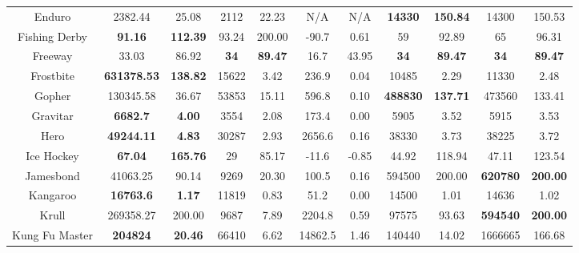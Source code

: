 \documentclass[nohyperref]{article}
\newcommand{\best}[1]{\textbf{#1}}
\theoremstyle{plain}
\begin{document}
\begin{table}[!hb]
\begin{center}
\begin{tabular}{|c |c c| c c| c c| c c| c c| }
 Enduro             & 2382.44                 & 25.08       & 2112              &22.23         & N/A               & N/A     & \best{14330}    & \best{150.84}  &14300     &150.53\\
 Fishing Derby      & \textbf{91.16}          & \textbf{112.39     }              &93.24          &200.00      &-90.7     & 0.61    & 59        & 92.89         &65        &96.31\\
 Freeway            & 33.03                   & 86.92       & \textbf{34}                 &\textbf{89.47}          &16.7               & 43.95   & \best{34}      & \best{89.47}  &\textbf{34}        &\textbf{89.47}\\
 Frostbite          & \textbf{631378.53}      & \textbf{138.82}     & 15622    &3.42       &236.9     & 0.04    & 10485                        & 2.29           &11330     &2.48\\
 Gopher             & 130345.58               & 36.67      & 53853             &15.11         &596.8              & 0.10       & \best{488830} & \best{137.71}  &473560    &133.41\\
 Gravitar           & \textbf{6682.7     }    & \textbf{4.00    }  & 3554     &2.08      &173.4     & 0.00    & 5905                           & 3.52           &5915      &3.53\\
 Hero               & \textbf{49244.11}       & \textbf{4.83    }  & 30287    &2.93      &2656.6    & 0.16        & 38330                      & 3.73           &38225     &3.72\\
 Ice Hockey         & \textbf{67.04      }    & \textbf{165.76  }  & 29        &85.17         &-11.6     & -0.85       &44.92              &118.94        &47.11           &123.54\\
 Jamesbond          & 41063.25                & 90.14     & 9269              &20.30         &100.5     & 0.16    &594500              &200.00  &\textbf{620780}          &\textbf{200.00}\\
 Kangaroo           & \textbf{16763.6        }& \textbf{1.17}  & 11819     &0.83      &51.2      & 0.00    & 14500                              & 1.01          &14636           &1.02\\
 Krull              & 269358.27      & 200.00 & 9687     &7.89       &2204.8    & 0.59    & 97575                        & 93.63          &\textbf{594540}          &\textbf{200.00}\\
 Kung Fu Master     & \textbf{204824         }& \textbf{20.46}  & 66410    &6.62       &14862.5   & 1.46    & 140440                           & 14.02          &1666665          &166.68\\

\end{tabular}
\end{center}
\end{table}
\end{document}
